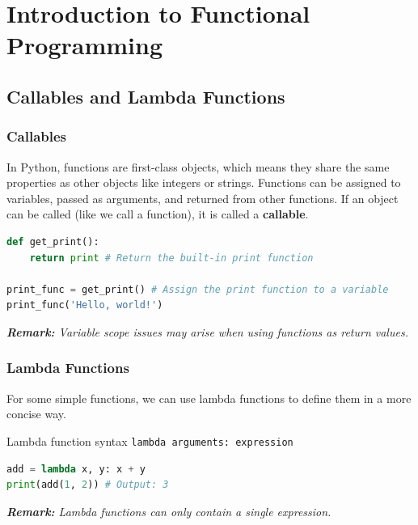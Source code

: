 \documentclass[beamer, en, version=2.0]{huangfusl-template}
\begin{document}
    \section{Introduction to Functional Programming}
    \subsection{Callables and Lambda Functions}
    \begin{frame}[fragile]
        \frametitle{Callables}

        In Python, functions are first-class objects, which means they share the same properties as other objects like integers or strings. Functions can be assigned to variables, passed as arguments, and returned from other functions. If an object can be called (like we call a function), it is called a \textbf{callable}.

\begin{lstlisting}[language=python]
def get_print():
    return print # Return the built-in print function

print_func = get_print() # Assign the print function to a variable
print_func('Hello, world!')
\end{lstlisting}

        {\footnotesize\itshape\textbf{Remark:} Variable scope issues may arise when using functions as return values.}

    \end{frame}
    \begin{frame}[fragile]
        \frametitle{Lambda Functions}

        For some simple functions, we can use lambda functions to define them in a more concise way.

        \begin{block}{Lambda function syntax}
            {\footnotesize\verb|lambda arguments: expression|}
        \end{block}

\begin{lstlisting}[language=python]
add = lambda x, y: x + y
print(add(1, 2)) # Output: 3
\end{lstlisting}

        {\footnotesize\itshape\textbf{Remark:} Lambda functions can only contain a single expression.}
    \end{frame}
\end{document}
